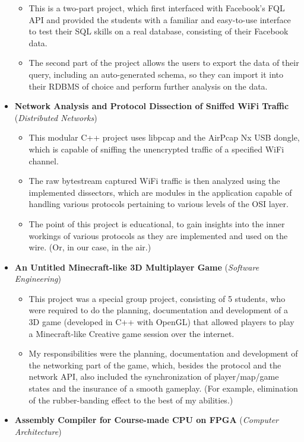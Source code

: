 \documentclass[11pt,a4paper]{article}
\begin{document}
\begin{itemize}
		\begin{itemize}
		\item	This is a two-part project, which first interfaced with Facebook's FQL API and provided the students with a familiar and easy-to-use interface to test their SQL skills on a real database, consisting of their Facebook data.
		\item	The second part of the project allows the users to export the data of their query, including an auto-generated schema, so they can import it into their RDBMS of choice and perform further analysis on the data.
		\end{itemize}
	\item	\textbf{Network Analysis and Protocol Dissection of Sniffed WiFi Traffic} (\textit{Distributed Networks})
		\begin{itemize}
		\item	This modular C++ project uses libpcap and the AirPcap Nx USB dongle, which is capable of sniffing the unencrypted traffic of a specified WiFi channel.
		\item	The raw bytestream captured WiFi traffic is then analyzed using the implemented dissectors, which are modules in the application capable of handling various protocols pertaining to various levels of the OSI layer.
		\item	The point of this project is educational, to gain insights into the inner workings of various protocols as they are implemented and used on the wire. (Or, in our case, in the air.)
		\end{itemize}
	\item	\textbf{An Untitled Minecraft-like 3D Multiplayer Game} (\textit{Software Engineering})
		\begin{itemize}
		\item	This project was a special group project, consisting of 5 students, who were required to do the planning, documentation and development of a 3D game (developed in C++ with OpenGL) that allowed players to play a Minecraft-like Creative game session over the internet.
		\item	My responsibilities were the planning, documentation and development of the networking part of the game, which, besides the protocol and the network API, also included the synchronization of player/map/game states and the insurance of a smooth gameplay. (For example, elimination of the rubber-banding effect to the best of my abilities.)
		\end{itemize}
	\item	\textbf{Assembly Compiler for Course-made CPU on FPGA} (\textit{Computer Architecture})

\end{itemize}
\end{document}
